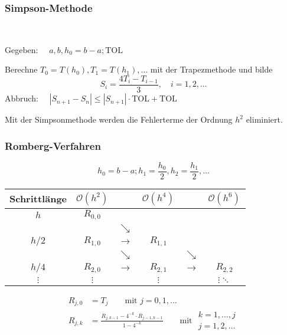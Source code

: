 		\subsubsection{Simpson-Methode}
			\begin{algo}~

				Gegeben: $\quad a, b, h_0 = b-a ; \mathrm{TOL}$

				Berechne $T_0=T(h_0), T_1=T(h_1), \dots$ mit der Trapezmethode und bilde
				\[
					S_i = \frac{4T_i-T_{i-1}}{3}, \quad i=1,2,\dots
				\]
				Abbruch: $\quad |S_{n+1}-S_n|\leq |S_{n+1}|\cdot \mathrm{TOL} + \mathrm{TOL}$

				Mit der Simpsonmethode werden die Fehlerterme der Ordnung $h^2$ eliminiert.
			\end{algo}

		\subsubsection{Romberg-Verfahren}
			\[
				h_0 = b-a ; h_1=\frac{h_0}{2}, h_2 = \frac{h_1}{2}, \dots
			\]
			\begin{center}
				\begin{tabular}{c|ccccc}
					\toprule
					Schrittlänge & $\mathcal{O}\left( h^2\right)$ & & $\mathcal{O}\left( h^4\right)$ & & $\mathcal{O}\left( h^6\right)$ \\
					\midrule $h$ & $R_{0,0}$ & & & & \\
					& & $\searrow$ & & & \\
					$h/2$ & $R_{1,0}$ & $\rightarrow$ & $R_{1,1}$ & & \\
					& & $\searrow$ & & $\searrow$ & \\
					$h/4$ & $R_{2,0}$ & $\rightarrow$ & $R_{2,1}$ & $\rightarrow$ & $R_{2,2}$ \\
					$\vdots$ & $\vdots$ & & $\vdots$ & & $\vdots\ddots$ \\
					\bottomrule
				\end{tabular}
			\end{center}
			\begin{align*}
				R_{j,0} &= T_j \qquad \text{mit } j = 0, 1, \dots \\
				R_{j,k} &= \frac{R_{j,k-1} - 4^{-k}\cdot R_{j-1,k-1}}{1-4^{-k}} \qquad \text{mit }
				\begin{array}{l}
					k= 1, \dots , j \\
					j = 1,2, \dots
				\end{array}
			\end{align*}

